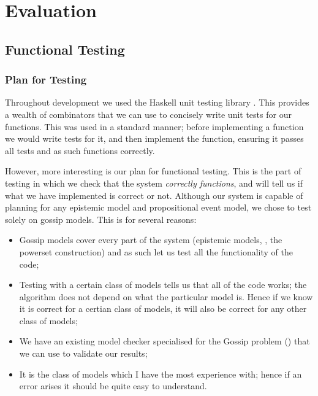 \documentclass[10pt, a4paper]{report}
\begin{document}
\newpage

\chapter{Evaluation}

\section{Functional Testing}

\subsection{Plan for Testing}

Throughout development we used the Haskell unit testing library . This provides
a wealth of combinators that we can use to concisely write unit tests for our
functions. This was used in a standard manner; before implementing a function we
would write tests for it, and then implement the function, ensuring it passes
all tests and as such functions correctly.

However, more interesting is our plan for functional testing. This is the part
of testing in which we check that the system \emph{correctly functions}, and
will tell us if what we have implemented is correct or not. Although our system
is capable of planning for any epistemic model and propositional event model, we
chose to test solely on gossip models. This is for several reasons:

\begin{itemize}
\item Gossip models cover every part of the system (epistemic models, \mestar,
  the powerset construction) and as such let us test all the functionality of
  the code;
\item Testing with a certain class of models tells us that all of the code
  works; the algorithm does not depend on what the particular model is. Hence if
  we know it is correct for a certian class of models, it will also be correct
  for any other class of models;
\item We have an existing model checker specialised for the Gossip problem
  (\cite{GithubGossip}) that we can use to validate our results;
\item It is the class of models which I have the most experience with; hence if
  an error arises it should be quite easy to understand.
\end{itemize}
\end{document}
